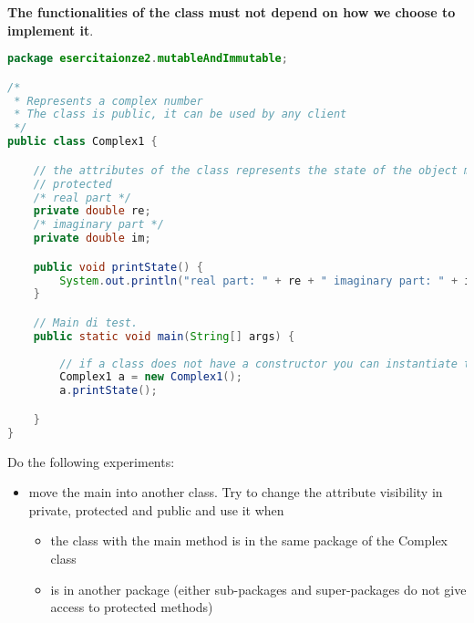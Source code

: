 \documentclass{article}
\begin{document}
\textbf{The functionalities of the class must not depend on how we choose to implement it}.

\begin{lstlisting}[language=Java,escapechar=|]
package esercitaionze2.mutableAndImmutable;

/*
 * Represents a complex number
 * The class is public, it can be used by any client
 */
public class Complex1 {

	// the attributes of the class represents the state of the object modeled by the class and are usually private or 
	// protected
	/* real part */
	private double re;
	/* imaginary part */
	private double im;

	public void printState() {
		System.out.println("real part: " + re + " imaginary part: " + im);
	}

	// Main di test.
	public static void main(String[] args) {
		
		// if a class does not have a constructor you can instantiate the class using the default constructor
		Complex1 a = new Complex1();
		a.printState();

	}
}
\end{lstlisting}

Do the following experiments:
\begin{itemize}
\item move the main into another class. Try to change the attribute visibility in private, protected and public and use it when
\begin{itemize}
\item the class with the main method is in the same package of the Complex class
\item is in another package (either sub-packages and super-packages do not give access to protected methods)
\end{itemize}
\end{itemize}
\end{document}
